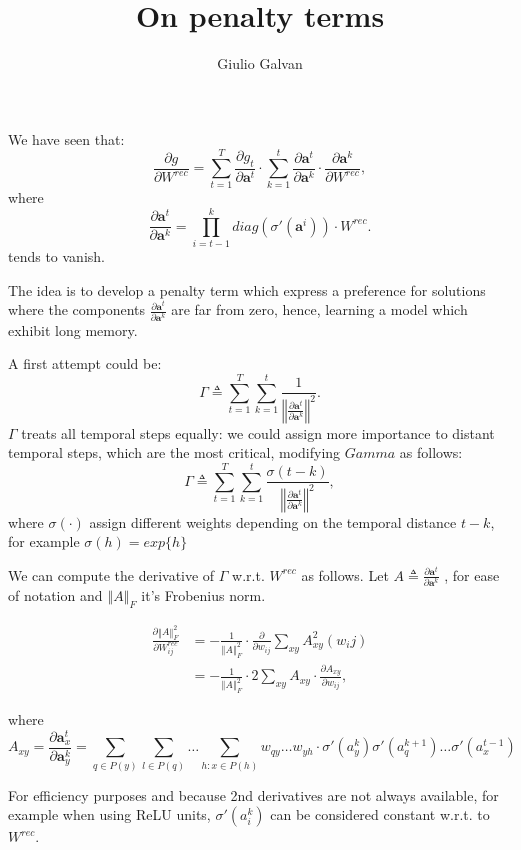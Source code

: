 \documentclass{article}
\title{On penalty terms}
\author{Giulio Galvan}
\renewcommand{\vec}[1]{\boldsymbol{#1}}
\newcommand{\mat}[1]{#1}
\newcommand{\norm}[1]{\left\Vert #1 \right\Vert}
\newcommand{\defeq}{\triangleq}
\begin{document}
	\maketitle

We have seen that:
\begin{equation}
	\frac{\partial g}{\partial \mat{W}^{rec}}= \sum_{t=1}^T\frac{\partial g_t}{\partial \vec{a}^t} \cdot \sum_{k=1}^t \frac{\partial \vec{a}^t}{\partial \vec{a}^k} \cdot \frac{\partial \vec{a}^k}{\partial \mat{W}^{rec}},
\end{equation}
where 
\begin{equation}
	\frac{\partial \vec{a}^t}{\partial \vec{a}^k} = \prod_{i=t-1}^{k}  diag(\sigma'(\vec{a}^i)) \cdot \mat{W}^{rec}.
	\label{eq:temporalComponent}
\end{equation}
tends to vanish.

The idea is to develop a penalty term which express a preference for solutions where the components $\frac{\partial \vec{a}^t}{\partial \vec{a}^k}$ are far from zero, hence, learning a model which exhibit long memory.

A first attempt could be:
\begin{equation}
\Gamma \defeq \sum_{t=1}^T\sum_{k=1}^t \frac{1}{\norm{\frac{\partial \vec{a}^t}{\partial \vec{a}^k}}^2}.
\end{equation}
$\Gamma$ treats all temporal steps equally: we could assign more importance to distant temporal steps, which are the most critical, modifying $Gamma$ as follows:
\begin{equation}
\Gamma \defeq \sum_{t=1}^T\sum_{k=1}^t \frac{\sigma(t-k)}{\norm{\frac{\partial \vec{a}^t}{\partial \vec{a}^k}}^2},
\end{equation}
where $\sigma(\cdot)$ assign different weights depending on the temporal distance $t-k$, for example $\sigma(h)=exp\{h\}$

We can compute the derivative of $\Gamma$ w.r.t. $\mat{W}^{rec}$ as follows.
Let $A\defeq\frac{\partial \vec{a}^t}{\partial \vec{a}^k}$	, for ease of notation and $\norm{A}_F$ it's Frobenius norm.

\begin{align}
	\frac{\partial \norm{A}^2_F}{\partial \mat{W}_{ij}^{rec}}&=- \frac{1}{\norm{A}^2_F}\cdot \frac{\partial}{\partial w_{ij}} \sum_{xy} A_{xy}^2(w_ij)\\
	&=- \frac{1}{\norm{A}^2_F}\cdot 2\sum_{xy} A_{xy}\cdot \frac{\partial A_{xy}}{\partial w_{ij}},
\end{align}

where \begin{equation} 
A_{xy}=\frac{\partial \vec{a}_x^t}{\partial \vec{a}_y^k} = \sum_{q\in P(y)} \sum_{l \in P(q)} \hdots \sum_{h : x \in P(h)} w_{qy} \hdots w_{yh} \cdot \sigma'(a_y^k)\sigma'(a_q^{k+1}) \hdots \sigma'(a_x^{t-1})
\label{expanded_mem}
\end{equation}

For efficiency purposes and because 2nd derivatives are not always available, for example when using ReLU units, $\sigma'(a_i^k)$ can be considered constant w.r.t. to $\mat{W^{rec}}$.
\end{document}
